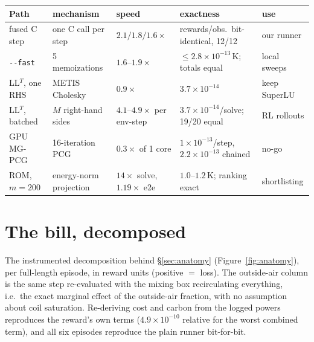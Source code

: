 \documentclass{article}
\newcommand{\e}[1]{\times10^{-#1}}
\begin{document}
\begin{center}
\centering
{}
\label{tab:tools}
\footnotesize
\setlength{\tabcolsep}{2pt}
\begin{tabular}{@{}lllll@{}}
\toprule
Path & mechanism & speed & exactness & use \\
\midrule
fused C step & one C call per step & $2.1/1.8/1.6\times$ & rewards/obs.\ bit-identical, 12/12 & our runner \\
\texttt{-{}-fast} & 5 memoizations & $1.6$--$1.9\times$ & $\le2.8\e{13}$\,K; totals equal & local sweeps \\
LL$^T$, one RHS & METIS Cholesky & $0.9\times$ & $3.7\e{14}$ & keep SuperLU \\
LL$^T$, batched & $M$ right-hand sides & $4.1$--$4.9\times$ per env-step & $3.7\e{14}$/solve; 19/20 equal & RL rollouts \\
GPU MG-PCG & 16-iteration PCG & $0.3\times$ of 1 core & $1\e{13}$/step, $2.2\e{13}$ chained & no-go \\
ROM, $m=200$ & energy-norm projection & $14\times$ solve, $1.19\times$ e2e & $1.0$--$1.2$\,K; ranking exact & shortlisting \\
\bottomrule
\end{tabular}
\end{center}

\section{The bill, decomposed}
\label{app:energy}

The instrumented decomposition behind \S\ref{sec:anatomy} (Figure~\ref{fig:anatomy}), per
full-length episode, in reward units (positive $=$ loss). The outside-air column is the same step re-evaluated
with the mixing box recirculating everything, i.e.\ the exact marginal effect of the
outside-air fraction, with no assumption about coil saturation. Re-deriving cost and
carbon from the logged powers reproduces the reward's own terms ($4.9\e{10}$ relative for the
worst combined term), and all six episodes reproduce the plain runner bit-for-bit.
\end{document}
